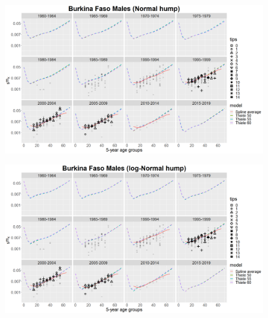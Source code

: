 \documentclass[12pt,a4paper]{article}
\begin{document}
\newpage
\begin{figure}[H]
\includegraphics[width = \linewidth]{dhs males normal.png}
\end{figure}
\begin{figure}[H]
\includegraphics[width = \linewidth]{dhs males log-normal.png}
\end{figure}
\end{document}
